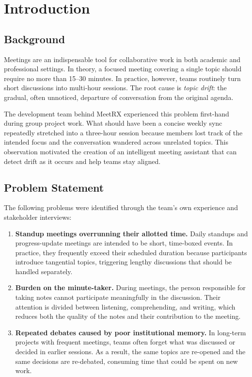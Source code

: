 \chapter{Introduction}
\label{chap:introduction}

\section{Background}
\label{section:background}

Meetings are an indispensable tool for collaborative work in both academic and professional settings.
In theory, a focused meeting covering a single topic should require no more than 15--30 minutes.
In practice, however, teams routinely turn short discussions into multi-hour sessions.
The root cause is \textit{topic drift}: the gradual, often unnoticed, departure of conversation from the
original agenda.

The development team behind MeetRX experienced this problem first-hand during group project work.
What should have been a concise weekly sync repeatedly stretched into a three-hour session because
members lost track of the intended focus and the conversation wandered across unrelated topics.
This observation motivated the creation of an intelligent meeting assistant that can detect drift as it
occurs and help teams stay aligned.

\section{Problem Statement}
\label{section:problem-statement}

The following problems were identified through the team's own experience and stakeholder interviews:

\begin{enumerate}
    \item \textbf{Standup meetings overrunning their allotted time.} Daily standups and progress-update
          meetings are intended to be short, time-boxed events. In practice, they frequently exceed their
          scheduled duration because participants introduce tangential topics, triggering lengthy discussions
          that should be handled separately.

    \item \textbf{Burden on the minute-taker.} During meetings, the person responsible for taking notes
          cannot participate meaningfully in the discussion. Their attention is divided between listening,
          comprehending, and writing, which reduces both the quality of the notes and their contribution to
          the meeting.

    \item \textbf{Repeated debates caused by poor institutional memory.} In long-term projects with
          frequent meetings, teams often forget what was discussed or decided in earlier sessions. As a result,
          the same topics are re-opened and the same decisions are re-debated, consuming time that could be
          spent on new work.
\end{enumerate}

